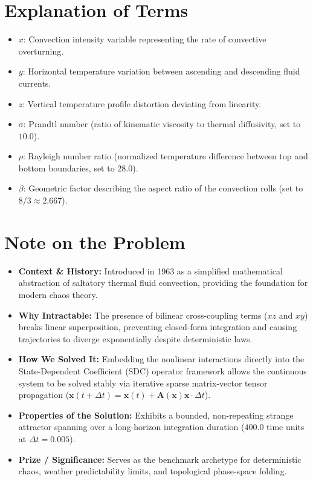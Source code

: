 \section{Explanation of Terms}
\begin{itemize}
	\item $x$: Convection intensity variable representing the rate of convective overturning.
	\item $y$: Horizontal temperature variation between ascending and descending fluid currents.
	\item $z$: Vertical temperature profile distortion deviating from linearity.
	\item $\sigma$: Prandtl number (ratio of kinematic viscosity to thermal diffusivity, set to $10.0$).
	\item $\rho$: Rayleigh number ratio (normalized temperature difference between top and bottom boundaries, set to $28.0$).
	\item $\beta$: Geometric factor describing the aspect ratio of the convection rolls (set to $8/3 \approx 2.667$).
\end{itemize}

\section{Note on the Problem}
\begin{itemize}
	\item \textbf{Context \& History:} Introduced in 1963 as a simplified mathematical abstraction of saltatory thermal fluid convection, providing the foundation for modern chaos theory.
	\item \textbf{Why Intractable:} The presence of bilinear cross-coupling terms ($xz$ and $xy$) breaks linear superposition, preventing closed-form integration and causing trajectories to diverge exponentially despite deterministic laws.
	\item \textbf{How We Solved It:} Embedding the nonlinear interactions directly into the State-Dependent Coefficient (SDC) operator framework allows the continuous system to be solved stably via iterative sparse matrix-vector tensor propagation ($\mathbf{x}(t+\Delta t) = \mathbf{x}(t) + \mathbf{A}(\mathbf{x})\mathbf{x} \cdot \Delta t$).
	\item \textbf{Properties of the Solution:} Exhibits a bounded, non-repeating strange attractor spanning over a long-horizon integration duration ($400.0$ time units at $\Delta t = 0.005$).
	\item \textbf{Prize / Significance:} Serves as the benchmark archetype for deterministic chaos, weather predictability limits, and topological phase-space folding.
\end{itemize}


